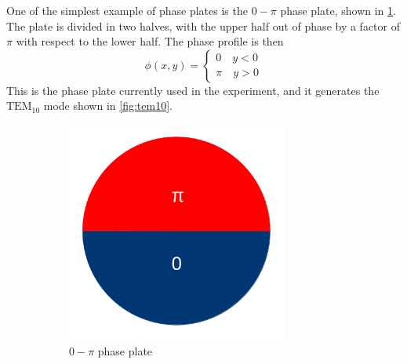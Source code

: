 One of the simplest example of phase plates is the $0-\pi$ phase plate, shown in \cref{fig:0pi}. The plate is divided in two halves, with the upper half out of phase by a factor of $\pi$ with respect to the lower half. The phase profile is then
\begin{equation}
    \phi(x,y) =
    \begin{cases}
        0 \quad y < 0 \\
        \pi \quad y > 0
    \end{cases}
\end{equation}
This is the phase plate currently used in the experiment, and it generates the $\text{TEM}_{10}$ mode shown in \cref{fig:tem10}.

\begin{figure}
    \begin{subfigure}[t]{0.4\textwidth}
        \centering
        \includegraphics[width=0.8\textwidth, valign=c]{chapters/chapter_2/figures/0pi}
        \caption{$0-\pi$ phase plate}
        \label{fig:0pi}
    \end{subfigure}
    \hfill
    \begin{subfigure}[t]{0.6\textwidth}
        \centering

\end{subfigure}
\end{figure}
